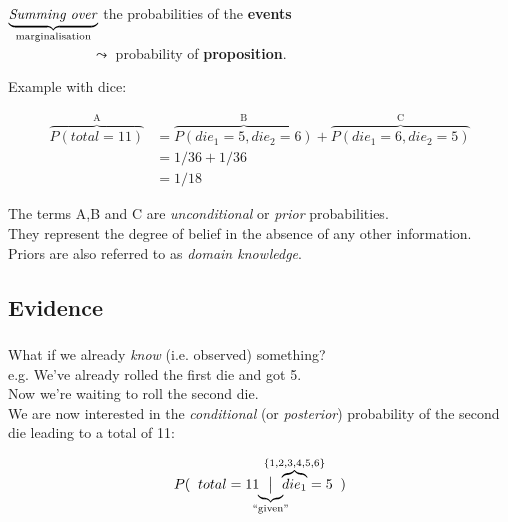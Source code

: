 \begin{frame}

$\underbrace{\text{\emph{Summing over}}}_{\text{marginalisation}}$ the probabilities of the \textbf{events} \\
$\qquad\qquad\qquad\leadsto$ probability of \textbf{proposition}.\\

\pause

Example with dice:

\begin{align}
\overbrace{P({total} = 11)}^{\text{A}} &= \overbrace{P({die}_{1} = 5, {die}_{2} = 6)}^{\text{B}} + \overbrace{P({die}_{1} = 6, {die}_{2} = 5)}^{\text{C}}\\
        &= 1 / 36 + 1/36\\
        &= 1/18
\end{align}

The terms A,B and C are \emph{unconditional} or \emph{prior} probabilities.\\
They represent the degree of belief in the absence of any other information.\\
Priors are also referred to as \emph{domain knowledge}.
        
\end{frame}

\subsection{Evidence}

\begin{frame}\frametitle{\subsecname}

What if we already \emph{know} (i.e. observed) something?\\

e.g. We've already rolled the first die and got 5.\\
Now we're waiting to roll the second die.\\

We are now interested in the \emph{conditional} (or \emph{posterior}) probability of the second die leading to a total of 11:

\begin{equation}
P(\;\;{total}= 11 \kern-1.5ex  \underbrace{\big| }_{\text{``given''}} \kern-1.5ex \overbrace{{die}_{1}}^{\mathclap{\{1,2,3,4,5,6\}}} = 5\;\;)
\end{equation}

\end{frame}

